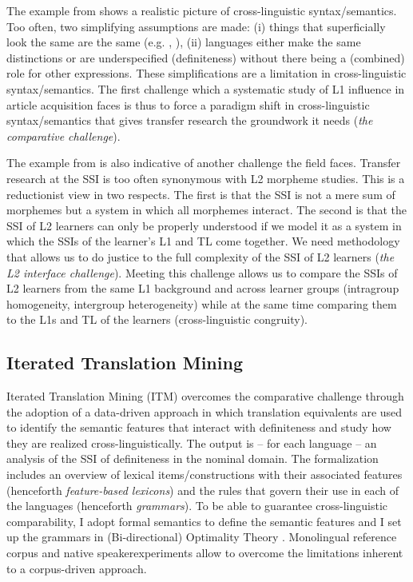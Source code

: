 \documentclass[output=paper,
modfonts
]{langscibook}
\begin{document}
The example from \citet{SnapeLeungTing2006} shows a realistic picture of cross-linguistic syntax/semantics. Too often, two simplifying assumptions are made: (i) things that superficially look the same are the same (e.g. , ), (ii) languages either make the same distinctions or are underspecified (definiteness) without there being a (combined) role for other expressions. These simplifications are a limitation in cross-linguistic syntax/semantics. The first challenge which a systematic study of L1 influence in article acquisition faces is thus to force a paradigm shift in cross-linguistic syntax/semantics that gives transfer research the groundwork it needs (\textit{the comparative challenge}).

The example from \citet{SnapeLeungTing2006} is also indicative of another challenge the field faces. Transfer research at the SSI is too often synonymous with L2 morpheme studies. This is a reductionist view in two respects. The first is that the SSI is not a mere sum of morphemes but a system in which all morphemes interact. The second is that the SSI of L2 learners can only be properly understood if we model it as a system in which the SSIs of the learner’s L1 and TL come together. We need methodology that allows us to do justice to the full complexity of the SSI of L2 learners (\textit{the L2 interface challenge}). Meeting this challenge allows us to compare the SSIs of L2 learners from the same L1 background and across learner groups (intragroup homogeneity, intergroup heterogeneity) while at the same time comparing them to the L1s and TL of the learners (cross-linguistic congruity).

\subsection{Iterated Translation Mining}

Iterated Translation Mining (ITM) overcomes the comparative challenge through the adoption of a data-driven approach in which translation equivalents are used to identify the semantic features that interact with definiteness and study how they are realized cross-linguistically. The output is -- for each language -- an analysis of the SSI of definiteness in the nominal domain. The formalization includes an overview of lexical items/constructions with their associated features (henceforth \textit{feature-based lexicons}) and the rules that govern their use in each of the languages (henceforth \textit{grammars}). To be able to guarantee cross-linguistic comparability, I adopt formal semantics to define the semantic features and I set up the grammars in (Bi-directional) Optimality Theory \citep{PrinceSmolensky2004,Hendriksetal2010}. Monolingual reference corpus and native speaker\largerpage experiments allow to overcome the limitations inherent to a corpus-driven approach.
\end{document}
